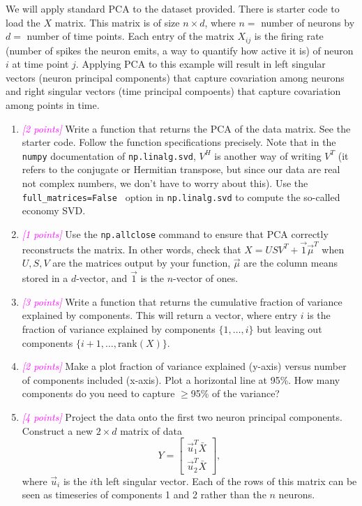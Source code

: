 \documentclass{article}
\newcommand{\points}[1]{\small\textcolor{magenta}{\emph{[#1 points]}} \normalsize}
\begin{document}
\vspace{1em}
We will apply standard PCA to the dataset provided. There is starter code to load the $X$ matrix.
This matrix is of size $n \times d$, where
$n = $ number of neurons by $d = $ number of time points.
Each entry of the matrix $X_{ij}$ is the firing rate (number of spikes the neuron emits, a way to quantify how active it is) of neuron $i$ at time point $j$.
Applying PCA to this example will result in left singular vectors (neuron principal components)
that capture covariation among neurons and right singular vectors (time principal compoents)
that capture covariation among points in time.
\begin{enumerate}
\item \points{2} Write a function that returns the PCA of the data matrix. See the starter code.
  Follow the function specifications precisely.
  Note that in the {\tt numpy} documentation of {\tt np.linalg.svd}, 
  $V^H$ is another way of writing $V^T$ 
  (it refers to the conjugate or Hermitian transpose, 
  but since our data are real not complex numbers,
  we don't have to worry about this).
  Use the {\tt full\_matrices=False } option in {\tt np.linalg.svd} to compute the so-called economy SVD.
\item \points{1} Use the {\tt np.allclose} command to ensure that PCA correctly reconstructs the matrix.
  In other words, check that $X = U S V^T + \vec 1 \vec\mu^T$ when $U, S, V$ 
  are the matrices output by your function,
  $\vec \mu$ are the column means stored in a $d$-vector, and $\vec 1$ is the $n$-vector of ones.
\item \points{3}
  Write a function that returns the cumulative fraction of variance explained by components.
  This will return a vector, where entry $i$ is the fraction of variance explained
  by components $\{1, \ldots, i\}$ but leaving out components $\{i+1, \ldots, \mathrm{rank}(X)\}$.
\item \points{2}
  Make a plot fraction of variance explained (y-axis) versus number of components included (x-axis).
  Plot a horizontal line at 95\%. How many components do you need to capture $\geq$95\% of the variance?
\item \points{4}
  Project the data onto the first two neuron principal components.
  Construct a new $2 \times d$ matrix of data 
  $$
  Y = \begin{bmatrix} \vec u_1^T  \bar X \\ \vec u_2^T \bar X \end{bmatrix},
  $$
  where $\vec u_i$ is the $i$th left singular vector.
  Each of the rows of this matrix can be seen as timeseries of components 1 and 2
  rather than the $n$ neurons.
  

\end{enumerate}
\end{document}

